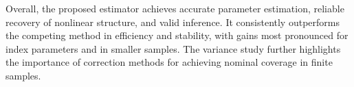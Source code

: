Overall, the proposed estimator achieves accurate parameter estimation, reliable recovery of nonlinear structure, and valid inference. It consistently outperforms the competing method in efficiency and stability, with gains most pronounced for index parameters and in smaller samples. The variance study further highlights the importance of correction methods for achieving nominal coverage in finite samples.








